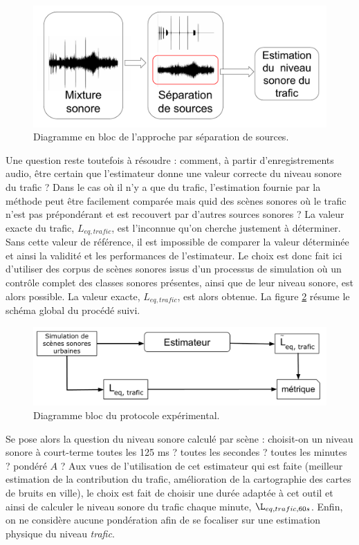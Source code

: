 
\begin{figure}[t]
\centering
\includegraphics[width=0.7\linewidth]{./figures/NMF/bloc_diagram_source_separation.pdf}
\caption{Diagramme en bloc de l'approche par séparation de sources.}
\label{fig:separation_source}
\end{figure}

Une question reste toutefois à résoudre : comment, à partir d'enregistrements audio, être certain que l'estimateur donne une valeur correcte du niveau sonore du trafic ? Dans le cas où il n'y a que du trafic, l'estimation fournie par la méthode peut être facilement comparée mais quid des scènes sonores où le trafic n'est pas prépondérant et est recouvert par d'autres sources sonores ? La valeur exacte du trafic, $L_{eq,trafic}$, est l'inconnue qu'on cherche justement à déterminer. Sans cette valeur de référence, il est impossible de comparer la valeur déterminée et ainsi la validité et les performances de l'estimateur.
Le choix est donc fait ici d'utiliser des corpus de scènes sonores issus d'un processus de simulation où un contrôle complet des classes sonores présentes, ainsi que de leur niveau sonore, est alors possible. La valeur exacte, $L_{eq,trafic}$, est alors obtenue. La figure \ref{fig:diagramBlocProtocol} résume le schéma global du procédé suivi.

\begin{figure}[t]
\centering
\includegraphics[width=0.7\linewidth]{./figures/NMF/Bloc_diagram_estimateur_FR.pdf}
\caption{Diagramme bloc du protocole expérimental.}
\label{fig:diagramBlocProtocol}
\end{figure}

Se pose alors la question du niveau sonore calculé par scène : choisit-on un niveau sonore à court-terme toutes les 125 ms ? toutes les secondes ? toutes les minutes ? pondéré $A$ ? Aux vues de l'utilisation de cet estimateur qui est faite (meilleur estimation de la contribution du trafic, amélioration de la cartographie des cartes de bruits en ville), le choix est fait de choisir une durée adaptée à cet outil et ainsi de calculer le niveau sonore du trafic chaque minute, $\L_{eq,trafic,60s}$. Enfin, on ne  considère aucune pondération afin de se focaliser sur une estimation physique du niveau \textit{trafic}.\\

